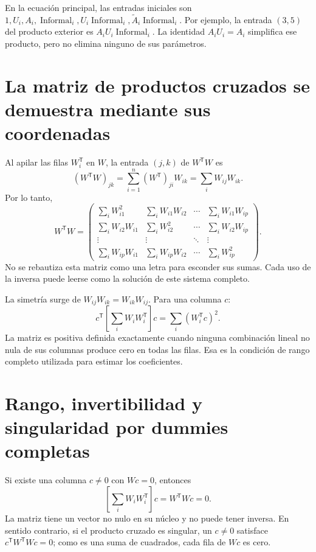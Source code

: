 \documentclass[11pt,a4paper]{article}
\begin{document}
En la ecuación principal, las entradas iniciales son $1,U_i,A_i,\operatorname{Informal}_i,U_i\operatorname{Informal}_i,\widetilde A_i\operatorname{Informal}_i$. Por ejemplo, la entrada $(3,5)$ del producto exterior es $A_iU_i\operatorname{Informal}_i$. La identidad $A_iU_i=A_i$ simplifica ese producto, pero no elimina ninguno de sus parámetros.

\clearpage
\section{La matriz de productos cruzados se demuestra mediante sus coordenadas}

Al apilar las filas $W_i^{\mathsf T}$ en $W$, la entrada $(j,k)$ de $W^{\mathsf T}W$ es
\[
(W^{\mathsf T}W)_{jk}=
\sum_{i=1}^{n}(W^{\mathsf T})_{ji}W_{ik}
=\sum_iW_{ij}W_{ik}.
\]
Por lo tanto,
\[
W^{\mathsf T}W=
\begin{pmatrix}
\sum_iW_{i1}^2&\sum_iW_{i1}W_{i2}&\cdots&\sum_iW_{i1}W_{ip}\\
\sum_iW_{i2}W_{i1}&\sum_iW_{i2}^2&\cdots&\sum_iW_{i2}W_{ip}\\
\vdots&\vdots&\ddots&\vdots\\
\sum_iW_{ip}W_{i1}&\sum_iW_{ip}W_{i2}&\cdots&\sum_iW_{ip}^2
\end{pmatrix}.
\]
No se rebautiza esta matriz como una letra para esconder sus sumas. Cada uso de la inversa puede leerse como la solución de este sistema completo.

La simetría surge de $W_{ij}W_{ik}=W_{ik}W_{ij}$. Para una columna $c$:
\[
c^{\mathsf T}\left[\sum_iW_iW_i^{\mathsf T}\right]c
=\sum_i(W_i^{\mathsf T}c)^2.
\]
La matriz es positiva definida exactamente cuando ninguna combinación lineal no nula de sus columnas produce cero en todas las filas. Esa es la condición de rango completo utilizada para estimar los coeficientes.

\clearpage
\section{Rango, invertibilidad y singularidad por dummies completas}

Si existe una columna $c\ne0$ con $Wc=0$, entonces
\[
\left[\sum_iW_iW_i^{\mathsf T}\right]c=W^{\mathsf T}Wc=0.
\]
La matriz tiene un vector no nulo en su núcleo y no puede tener inversa. En sentido contrario, si el producto cruzado es singular, un $c\ne0$ satisface
$c^{\mathsf T}W^{\mathsf T}Wc=0$; como es una suma de cuadrados, cada fila de $Wc$ es cero.
\end{document}
